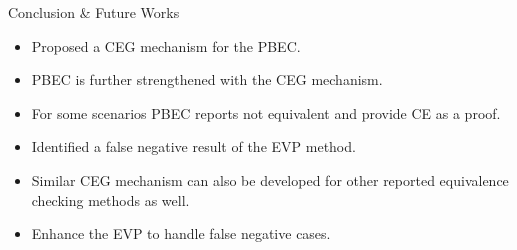 \begin{frame}{Conclusion \& Future Works}
\begin{itemize}
\item Proposed a CEG mechanism for the PBEC.
\item PBEC is further strengthened with the CEG mechanism.
\item For some scenarios PBEC reports not equivalent and provide CE as a proof.
\item Identified a false negative result of the EVP method.
\item Similar CEG mechanism can also be developed for other reported equivalence checking methods as well.
\item Enhance the EVP to handle false negative cases.
\end{itemize}
\end{frame}
